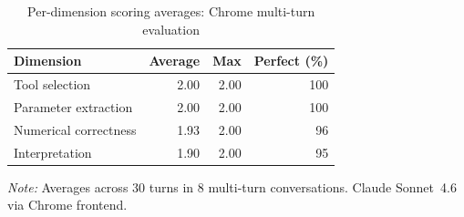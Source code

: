 \begin{table}[htbp]
\centering
\begin{threeparttable}
\caption{Per-dimension scoring averages: Chrome multi-turn evaluation}
\label{tab:e2e-dimensions}
\small
\begin{tabular}{lrrr}
\toprule
Dimension & Average & Max & Perfect (\%) \\
\midrule
Tool selection & 2.00 & 2.00 & 100 \\
Parameter extraction & 2.00 & 2.00 & 100 \\
Numerical correctness & 1.93 & 2.00 & 96 \\
Interpretation & 1.90 & 2.00 & 95 \\
\bottomrule
\end{tabular}
\begin{tablenotes}[flushleft]
\item \emph{Note:} Averages across 30 turns in 8 multi-turn
conversations. Claude Sonnet~4.6 via Chrome frontend.
\end{tablenotes}
\end{threeparttable}
\end{table}

